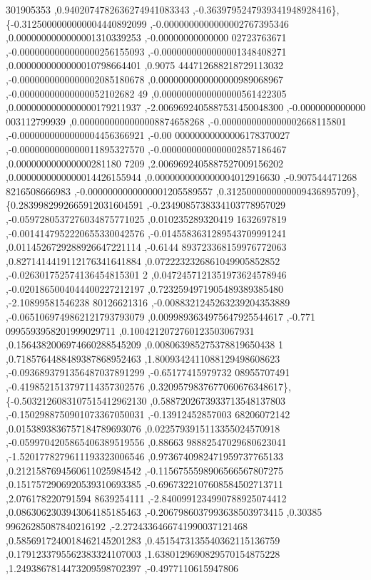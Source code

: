 \begin{DoxyCode}
      301905353 ,0.9402074782636274941083343 ,-0.3639795247939341948928416\},
\{-0.3125000000000004440892099 ,-0.0000000000000002767395346 ,0.0000000000000001310339253 ,-0.00000000000000
      02723763671 ,-0.0000000000000000256155093 ,-0.0000000000000001348408271 ,0.0000000000000010798664401 ,0.9075
      444712688218729113032 ,-0.0000000000000002085180678 ,0.0000000000000000989068967 ,-0.00000000000000052102682
      49 ,0.0000000000000000561422305 ,0.0000000000000000179211937 ,-2.0069692405887531450048300 ,-0.0000000000000
      003112799939 ,0.0000000000000008874658268 ,-0.0000000000000002668115801 ,-0.0000000000000004456366921 ,-0.00
      00000000000006178370027 ,-0.0000000000000011895327570 ,-0.0000000000000002857186467 ,0.000000000000000281180
      7209 ,2.0069692405887527009156202 ,0.0000000000000014426155944 ,0.0000000000000004012916630 ,-0.907544471268
      8216508666983 ,-0.0000000000000001205589557 ,0.3125000000000009436895709\},
\{0.2839982992665912031604591 ,-0.2349085738334103778957029 ,-0.0597280537276034875771025 ,0.010235289320419
      1632697819 ,-0.0014147952220655330042576 ,-0.0145583631289543709991241 ,0.0114526729288926647221114 ,-0.6144
      893723368159976772063 ,0.8271414419112176341641884 ,0.0722232326861049905852852 ,-0.026301752574136454815301
      2 ,0.0472457121351973624578946 ,-0.0201865004044400227212197 ,0.7232594971905489389385480 ,-2.10899581546238
      80126621316 ,-0.0088321245263239204353889 ,-0.0651069749862121793793079 ,0.0099893634975647925544617 ,-0.771
      0995593958201999029711 ,0.1004212072760123503067931 ,0.1564382006974660288545209 ,0.008063985275378819650438
      1 ,0.7185764488489387868952463 ,1.8009342411088129498608623 ,-0.0936893791356487037891299 ,-0.65177415979732
      08955707491 ,-0.4198521513797114357302576 ,0.3209579837677060676348617\},
\{-0.5032126083107515412962130 ,0.5887202673933713548137803 ,-0.1502988750901073367050031 ,-0.13912452857003
      68206072142 ,0.0153893836757184789693076 ,0.0225793915113355024570918 ,-0.0599704205865406389519556 ,0.88663
      98882547029680623041 ,-1.5201778279611193323006546 ,0.9736740982471959737765133 ,0.2121587694560611025984542
       ,-0.1156755598906566567807275 ,0.1517572906920539310693385 ,-0.6967322107608584502713711 ,2.076178220791594
      8639254111 ,-2.8400991234990788925074412 ,0.0863062303943064185185463 ,-0.2067986037993638503973415 ,0.30385
      99626285087840216192 ,-2.2724336466741990037121468 ,0.5856917240018462145201283 ,0.4515473135540362115136759
       ,0.1791233795562383324107003 ,1.6380129690829570154875228 ,1.2493867814473209598702397 ,-0.4977110615947806

\end{DoxyCode}
